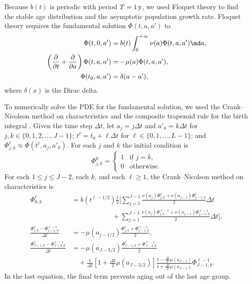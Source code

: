 \documentclass{jpmarticle}
\begin{document}
Because $b(t)$ is periodic with period $T = \unit[1]{y}$, we used
Floquet theory \autocite{parker_1992} to find the stable age
distribution and the asymptotic population growth rate. Floquet theory
requires the fundamental solution $\Phi(t, a, a')$ to
\begin{equation}
  \begin{split}
    \Phi(t, 0, a')
    &= b(t) \int_0^{+\infty} \nu(a) \Phi(t, a, a') \md a,
    \\
    \left(\frac{\partial}{\partial t}
      + \frac{\partial}{\partial a}\right)
    \Phi(t, a, a')
    &= - \mu(a) \Phi(t, a, a'),
    \\
    \Phi(t_0, a, a')
    &= \delta(a - a'),
  \end{split}
\end{equation}
where $\delta(x)$ is the Dirac delta.

To numerically solve the PDE for the fundamental solution, we used the
Crank--Nicolson method on characteristics and the composite trapezoid
rule for the birth integral \autocite{milner_1992}.  Given the time
step $\Delta t$, let $a_j = j \Delta t$ and $a'_k = k \Delta t$ for
$j, k \in \{0, 1, 2, \ldots, J - 1\}$;
$t^{\ell} = t_0 + \ell \Delta t$ for
$\ell \in \{0, 1, \ldots, L - 1\}$;
and $\Phi_{j, k}^{\ell} \approx \Phi(t^{\ell}, a_j, a'_k)$.
For each $j$ and $k$ the initial condition is
\begin{equation}
  \Phi_{j, k}^0 =
  \begin{cases}
    1 & \text{if $j = k$}, \\
    0 & \text{otherwise}.
  \end{cases}
\end{equation}
For each $1 \leq j \leq J - 2$, each $k$, and each $\ell
\geq 1$, the Crank--Nicolson method on characteristics is
\begin{equation}
  \begin{split}
    \Phi_{0, k}^{\ell}
    &= b(t^{\ell - 1 / 2})
    \frac{1}{2}
    \Bigg[\sum_{j = 1}^{J - 1}
    \frac{\nu(a_j) \Phi_{j, k}^{\ell}
      + \nu(a_{j - 1}) \Phi_{j - 1, k}^{\ell}}
    {2}
    \Delta t
    \\
    & \quad\quad\quad\quad\quad\quad {}
    + \sum_{j = 1}^{J - 1}
    \frac{\nu(a_j) \Phi_{j, k}^{\ell - 1}
      + \nu(a_{j - 1}) \Phi_{j - 1, k}^{\ell - 1}}
    {2}
    \Delta t
    \Bigg],
    \\
    \frac{\Phi_{j, k}^{\ell} - \Phi_{j - 1, k}^{\ell - 1}}{\Delta t}
    &= - \mu(a_{j - 1 / 2})
    \frac{\Phi_{j, k}^{\ell} + \Phi_{j - 1, k}^{\ell - 1}}{2},
    \\
    \frac{\Phi_{J - 1, k}^{\ell} - \Phi_{J - 2, k}^{\ell - 1}}{\Delta t}
    &= - \mu(a_{J - 3 / 2})
    \frac{\Phi_{J - 1, k}^{\ell} + \Phi_{J - 2, k}^{\ell - 1}}{2}
    \\
    & \quad {}
    + \frac{1}{\Delta t}
    \left[1 + \frac{\Delta t}{2} \mu(a_{J - 3 / 2})\right]
    \frac{1 - \frac{\Delta t}{2} \mu(a_{J - 1})}
    {1 + \frac{\Delta t}{2} \mu(a_{J - 1})}
    \Phi_{J - 1, k}^{\ell - 1}.
  \end{split}
\end{equation}
In the last equation, the final term prevents aging out of the last
age group.
\end{document}
